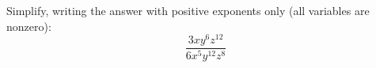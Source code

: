 Simplify, writing the answer with positive exponents only (all variables are nonzero):
\[
\dfrac{3xy^6z^{12}}{6x^5y^{12}z^8}
\]
